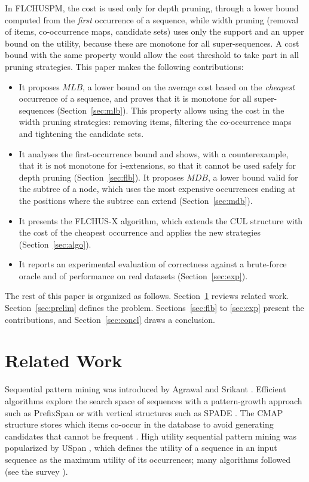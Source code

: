 \documentclass[pdflatex,sn-mathphys,Numbered]{sn-jnl}
\theoremstyle{thmstyleone}
\theoremstyle{thmstyletwo}
\theoremstyle{thmstylethree}
\newcommand{\FL}{\textsc{FLCHUSPM}}
\newcommand{\FX}{\textsc{FLCHUS-X}}
\newcommand{\mlb}{\ensuremath{\mathit{MLB}}}
\newcommand{\mdb}{\ensuremath{\mathit{MDB}}}
\begin{document}
In \FL{}, the cost is used only for depth pruning, through a lower bound computed from the
\emph{first} occurrence of a sequence, while width pruning (removal of items, co-occurrence maps,
candidate sets) uses only the support and an upper bound on the utility, because these are
monotone for all super-sequences. A cost bound with the same property would allow the cost
threshold to take part in all pruning strategies. This paper makes the following
contributions:
\begin{itemize}
\item It proposes \mlb, a lower bound on the average cost based on the \emph{cheapest}
  occurrence of a sequence, and proves that it is monotone for all super-sequences
  (Section~\ref{sec:mlb}). This property allows using the cost in the width pruning strategies:
  removing items, filtering the co-occurrence maps and tightening the candidate sets.
\item It analyses the first-occurrence bound and shows, with a counterexample, that it is not
  monotone for i-extensions, so that it cannot be used safely for depth pruning
  (Section~\ref{sec:flb}). It proposes \mdb, a lower bound valid for the subtree of a node, which
  uses the most expensive occurrences ending at the positions where the subtree can extend
  (Section~\ref{sec:mdb}).
\item It presents the \FX{} algorithm, which extends the CUL structure with the cost of the
  cheapest occurrence and applies the new strategies (Section~\ref{sec:algo}).
\item It reports an experimental evaluation of correctness against a brute-force oracle and of
  performance on real datasets (Section~\ref{sec:exp}).
\end{itemize}
The rest of this paper is organized as follows. Section~\ref{sec:related} reviews related work.
Section~\ref{sec:prelim} defines the problem. Sections~\ref{sec:flb} to \ref{sec:exp} present
the contributions, and Section~\ref{sec:concl} draws a conclusion.

\section{Related Work}\label{sec:related}

Sequential pattern mining was introduced by Agrawal and Srikant \cite{agrawal1995}. Efficient
algorithms explore the search space of sequences with a pattern-growth approach such as
PrefixSpan \cite{pei2004} or with vertical structures such as SPADE \cite{zaki2001}. The CMAP
structure stores which items co-occur in the database to avoid generating candidates that
cannot be frequent \cite{fournier2014cmap}. High utility sequential pattern mining was
popularized by USpan \cite{yin2012uspan}, which defines the utility of a sequence in an input
sequence as the maximum utility of its occurrences; many algorithms followed (see the survey
\cite{gan2021survey}).
\end{document}

